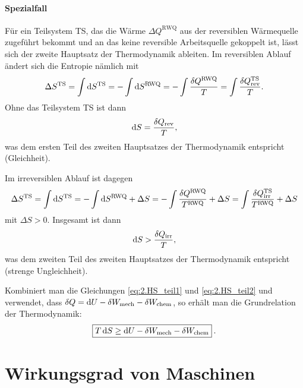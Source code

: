 \paragraph*{Spezialfall}

Für ein Teilsystem TS, das die Wärme $\Delta Q^{\mathrm{RWQ}}$ aus der reversiblen Wärmequelle zugeführt bekommt und an das keine reversible Arbeitsquelle gekoppelt ist, lässt sich der zweite Hauptsatz der Thermodynamik ableiten. 
Im reversiblen Ablauf ändert sich die Entropie nämlich mit 
\begin{align*}
    \Delta S^{\mathrm{TS}} = \int \mathop{}\!\mathrm{d} S^\mathrm{TS} = -\int \mathop{}\!\mathrm{d} S^\mathrm{RWQ} = - \int \frac{\mathop{}\!\delta Q^\mathrm{RWQ}}{T} = \int \frac{\mathop{}\!\delta Q^\mathrm{TS}_\mathrm{rev}}{T} .
\end{align*}
Ohne das Teilsystem TS ist dann 
\begin{align}
    \label{eq:2.HS_teil1}
    \mathop{}\!\mathrm{d} S = \frac{\mathop{}\!\delta Q_\mathrm{rev}}{T},
\end{align}
was dem ersten Teil des zweiten Hauptsatzes der Thermodynamik entspricht (Gleichheit). 

Im irreversiblen Ablauf ist dagegen 
\begin{align*}
    \Delta S^{\mathrm{TS}} = \int \mathop{}\!\mathrm{d} S^\mathrm{TS} = -\int \mathop{}\!\mathrm{d} S^\mathrm{RWQ} +\Delta S = - \int \frac{\mathop{}\!\delta Q^\mathrm{RWQ}}{T^\mathrm{RWQ}} + \Delta S = \int \frac{\mathop{}\!\delta Q^\mathrm{TS}_\mathrm{irr}}{T^\mathrm{RWQ}} +\Delta S
\end{align*}
mit $\Delta S>0$. Insgesamt ist dann 
\begin{align}
    \label{eq:2.HS_teil2}
    \mathop{}\!\mathrm{d} S > \frac{\mathop{}\!\delta Q_\mathrm{irr}}{T},
\end{align}
was dem zweiten Teil des zweiten Hauptsatzes der Thermodynamik entspricht (strenge Ungleichheit). 


Kombiniert man die Gleichungen \eqref{eq:2.HS_teil1} und \eqref{eq:2.HS_teil2} und verwendet, dass $\mathop{}\!\delta Q=\mathop{}\!\mathrm{d} U-\mathop{}\!\delta W_\mathrm{mech}-\mathop{}\!\delta W_\mathrm{chem}$, so erhält man die Grundrelation der Thermodynamik:
\begin{align}
    \label{eq:grundrelation_der_TD}
    \boxed{T\mathop{}\!\mathrm{d} S\geq \mathop{}\!\mathrm{d} U-\mathop{}\!\delta W_\mathrm{mech}-\mathop{}\!\delta W_\mathrm{chem}}\:.
\end{align}



\section{Wirkungsgrad von Maschinen}

